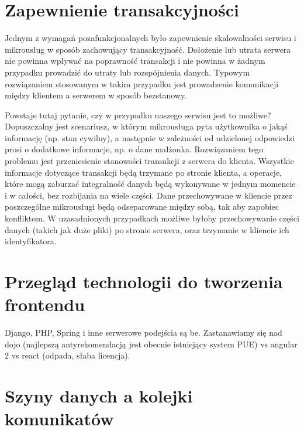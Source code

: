 \documentclass[licencjacka]{pracamgr}
\begin{document}
\section{Zapewnienie transakcyjności}

Jednym z wymagań pozafunkcjonalnych było zapewnienie skalowalności serwisu i mikrousług w sposób zachowujący transakcyjność.
Dołożenie lub utrata serwera nie powinna wpływać na poprawność transakcji i nie powinna w żadnym przypadku
prowadzić do utraty lub rozspójnienia danych. Typowym rozwiązaniem stosowanym w takim przypadku jest prowadzenie
komunikacji między klientem a serwerem w sposób bezstanowy.

Powstaje tutaj pytanie, czy w przypadku naszego serwisu jest to możliwe? Dopuszczalny jest scenariusz, w którym
mikrousługa pyta użytkownika o jakąś informację (np. stan cywilny), a następnie w zależności od udzielonej odpowiedzi
prosi o dodatkowe informacje, np. o dane małżonka. Rozwiązaniem tego problemu jest przeniesienie stanowości
transakcji z serwera do klienta. Wszystkie informacje dotyczące transakcji będą trzymane po stronie klienta, a
operacje, które mogą zaburzać integralność danych będą wykonywane w jednym momencie i w całości, bez rozbijania
na wiele części. Dane przechowywane w kliencie przez poszczególne mikrousługi będą odseparowane między sobą, tak aby
zapobiec konfliktom. W uzasadnionych przypadkach możliwe byłoby przechowywanie części danych (takich jak duże pliki)
po stronie serwera, oraz trzymanie w kliencie ich identyfikatora.

\section{Przegląd technologii do tworzenia frontendu}
Django, PHP, Spring i inne serwerowe podejścia są be. Zastanawiamy się nad dojo (najlepszą antyrekomendacją jest obecnie istniejący system PUE) vs angular 2 vs react (odpada, słaba licencja).

\section{Szyny danych a kolejki komunikatów}
\end{document}
